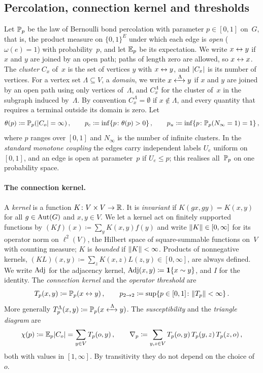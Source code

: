 \subsection{Percolation, connection kernel and thresholds}\label{sec:percolation}

Let $\mathbb P_p$ be the law of Bernoulli bond percolation with parameter $p\in[0,1]$ on~$G$, that is, the
product measure on $\{0,1\}^E$ under which each edge is \emph{open} ($\omega(e)=1$) with
probability~$p$, and let $\mathbb E_p$ be its expectation. We write $x\leftrightarrow y$ if $x$ and $y$ are joined
by an open path; paths of length zero are allowed, so $x\leftrightarrow x$. The \emph{cluster} $C_x$ of~$x$ is
the set of vertices $y$ with $x\leftrightarrow y$, and $\lvert C_x\rvert$ is its number of vertices. For a vertex set
$\Lambda\subseteq V$, a \emph{domain}, we write $x\xleftrightarrow{\;\Lambda\;}y$ if $x$ and $y$ are joined by an open
path using only vertices of~$\Lambda$, and $C_x^\Lambda$ for the cluster of~$x$ in the subgraph induced
by~$\Lambda$. By convention $C_x^\Lambda=\emptyset$ if $x\notin\Lambda$, and every quantity that
requires a terminal outside its domain is zero. Let
\begin{equation*}
  \theta(p)\coloneqq\mathbb P_p(\lvert C_o\rvert=\infty)\,,\qquad
  p_c\coloneqq\inf\{p\colon\theta(p)>0\}\,,\qquad
  p_u\coloneqq\inf\{p\colon\mathbb P_p(N_\infty=1)=1\}\,,
\end{equation*}
where $p$ ranges over $[0,1]$ and $N_\infty$ is the number of infinite clusters. In the \emph{standard monotone coupling} the
edges carry independent labels $U_e$ uniform on $[0,1]$, and an edge is open at parameter~$p$ if
$U_e\le p$; this realises all~$\mathbb P_p$ on one probability space.

\paragraph{The connection kernel.}
A \emph{kernel} is a function $K\colon V\times V\to\mathbb R$. It is \emph{invariant} if $K(gx,gy)=K(x,y)$
for all $g\in\operatorname{Aut}(G)$ and $x,y\in V$. We let a kernel act on finitely supported functions by
$(Kf)(x)\coloneqq\sum_yK(x,y)f(y)$ and write $\lVert K\rVert\in[0,\infty]$ for its operator norm on
$\ell^2(V)$, the Hilbert space of square-summable functions on~$V$ with counting measure; $K$ is
\emph{bounded} if $\lVert K\rVert<\infty$. Products of nonnegative kernels,
$(KL)(x,y)\coloneqq\sum_zK(x,z)L(z,y)\in[0,\infty]$, are always defined. We write $\operatorname{Adj}$ for the
adjacency kernel, $\operatorname{Adj}(x,y)\coloneqq\mathbf{1}\{x\sim y\}$, and $I$ for the identity. The \emph{connection
kernel} and the \emph{operator threshold} are
\begin{equation*}
  T_p(x,y)\coloneqq\mathbb P_p(x\leftrightarrow y)\,,\qquad
  p_{2\to 2}\coloneqq\sup\{p\in[0,1]\colon \lVert T_p\rVert<\infty\}\,.
\end{equation*}
More generally $T_p^\Lambda(x,y)\coloneqq\mathbb P_p(x\xleftrightarrow{\;\Lambda\;}y)$. The \emph{susceptibility} and the
\emph{triangle diagram} are
\begin{equation*}
  \chi(p)\coloneqq\mathbb E_p\lvert C_o\rvert=\sum_{y\in V}T_p(o,y)\,,\qquad
  \nabla_p\coloneqq\sum_{y,z\in V}T_p(o,y)\,T_p(y,z)\,T_p(z,o)\,,
\end{equation*}
both with values in $[1,\infty]$. By transitivity they do not depend on the choice of~$o$.

